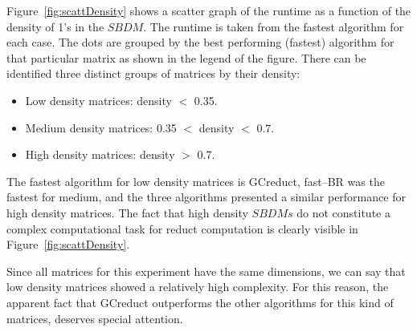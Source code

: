 \documentclass[authoryear,preprint,review,12pt]{elsarticle}
\begin{document}
	Figure~\ref{fig:scattDensity} shows a scatter graph of the runtime as a function of 
	the density of 1's in the $SBDM$. The runtime is taken from the fastest algorithm for 
	each case. The dots are grouped by the best performing (fastest) algorithm for that particular 
	matrix as shown in the legend of the figure. There can be identified three distinct groups of 
	matrices by their density:
	\begin{itemize}
	\item Low density matrices: density $<$ 0.35.
	\item Medium density matrices: 0.35 $<$ density $<$ 0.7.
	\item High density matrices: density $>$ 0.7.
	\end{itemize}
	The fastest algorithm for low density matrices is GCreduct, fast--BR was the fastest for medium, and the three algorithms presented a similar performance for high	density matrices. The fact that high density $SBDMs$ do not constitute a complex computational task for reduct computation \citep{Rojas12} is clearly visible in Figure~\ref{fig:scattDensity}. 

	
	Since all matrices for this experiment have the same dimensions, we can say that low density
	matrices showed a relatively high complexity. For this reason, the apparent fact that GCreduct outperforms 
	the other algorithms for this kind of matrices, deserves special attention. 
	
	
\end{document}
